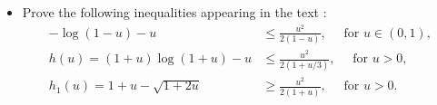 \documentclass[11pt]{article}
\begin{document}
\begin{itemize}
\item \begin{exercise}
Prove the following inequalities appearing in the text \citep{boucheron2013concentration}:
\begin{align}
- \log(1 - u) - u &\le \frac{u^2}{2(1 - u)}, \quad  \text{ for }u \in (0, 1), \label{ineqn: basic_log_square} \\
h(u) = (1 + u) \log(1 + u) - u &\le \frac{u^2}{2(1 + u/3)}, \quad\text{ for }u > 0,  \label{ineqn: basic_logistic} \\
h_1(u) = 1 + u - \sqrt{1 + 2u }&\ge \frac{u^2}{2(1 + u)},  \quad \text{ for }u > 0.  \label{ineqn: basic_sqrt}
\end{align}
\end{exercise}
\end{itemize}
\end{document}
